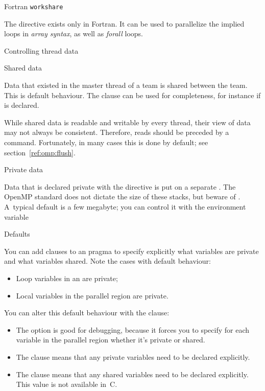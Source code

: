  {Fortran \texttt{workshare}}

The  directive exists only in Fortran.
It can be used to parallelize
the implied loops in \emph{array syntax},
as well as  \emph{forall} loops.


 {Controlling thread data}

 {Shared data}

Data that existed in the master thread of a team
is shared between the team. This is default behaviour.
The clause  can be used for completeness,
for instance if  is declared.

While shared data is readable and writable by every thread, their view
of data may not always be consistent. Therefore, reads should be
preceded by a  command.  Fortunately, in many cases
this is done by default; see section~\ref{ref:omp:flush}.

 {Private data}

Data that is declared private with the  directive is
put on a separate . The OpenMP standard
does not dictate the size of these stacks, but beware of .
A~typical default
is a few megabyte; you can control it with the environment variable


 {Defaults}

You can add clauses to an  pragma
to specify explicitly what variables are private and what variables shared.
Note the cases with default behaviour:
\begin{itemize}
\item Loop variables in an  are private;
\item Local variables in the parallel region are private.
\end{itemize}
You can alter this default behaviour with the  clause:
\begin{itemize}
\item The  option is good for debugging, 
  because it forces you to specify for each variable in the parallel region
  whether it's private or shared.
\item The  clause means that any private variables
  need to be declared explicitly.
\item The  clause means that any shared variables
  need to be declared explicitly. This value is not available in~C.
\end{itemize}

